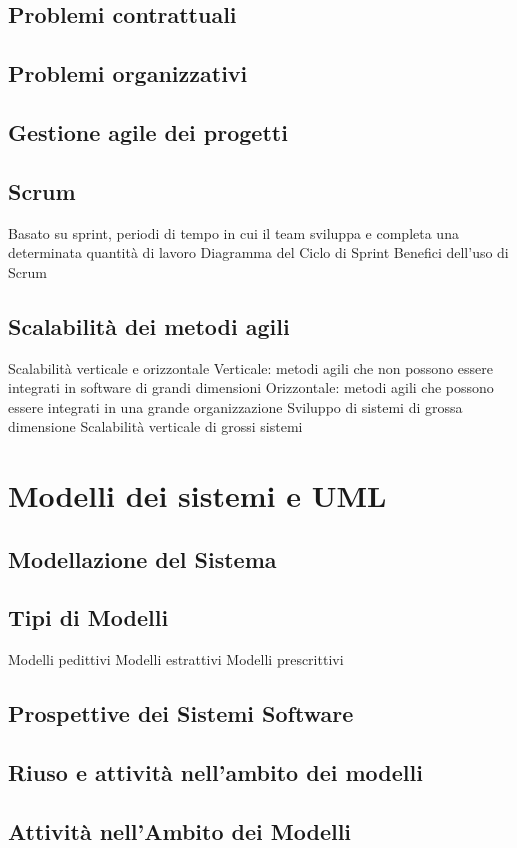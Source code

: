 \documentclass{article}
\begin{document}
	\subsection{Problemi contrattuali}
	\subsection{Problemi organizzativi}
	\subsection{Gestione agile dei progetti}
	\subsection{Scrum}
	Basato su sprint, periodi di tempo in cui il team sviluppa e completa una determinata quantità di lavoro
	Diagramma del Ciclo di Sprint
	Benefici dell’uso di Scrum
	\subsection{Scalabilità dei metodi agili}
	Scalabilità verticale e orizzontale
	Verticale: metodi agili che non possono essere integrati in software di grandi dimensioni
	Orizzontale: metodi agili che possono essere integrati in una grande organizzazione
	Sviluppo di sistemi di grossa dimensione
	Scalabilità verticale di grossi sistemi
	
	\section{Modelli dei sistemi e UML}
	\subsection{Modellazione del Sistema}
	\subsection{Tipi di Modelli}
	Modelli pedittivi
	Modelli estrattivi
	Modelli prescrittivi
	\subsection{Prospettive dei Sistemi Software}
	\subsection{Riuso e attività nell’ambito dei modelli}
	\subsection{Attività nell’Ambito dei Modelli}
\end{document}
